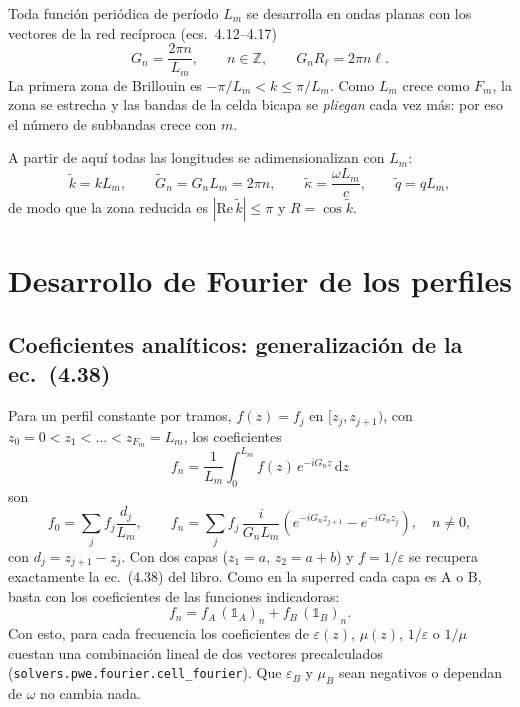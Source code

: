 \documentclass[11pt,a4paper]{article}
\newcommand{\dd}{\mathrm{d}}
\newcommand{\kt}{\tilde k}
\newcommand{\code}[1]{\texttt{#1}}
\begin{document}
Toda función periódica de período $L_m$ se desarrolla en ondas planas con los
vectores de la red recíproca (ecs.~4.12--4.17)
\begin{equation}
G_n=\frac{2\pi n}{L_m},\qquad n\in\mathbb Z,
\qquad G_n R_\ell=2\pi n\ell .
\end{equation}
La primera zona de Brillouin es $-\pi/L_m<k\le\pi/L_m$. Como $L_m$ crece como
$F_m$, la zona se estrecha y las bandas de la celda bicapa se \emph{pliegan}
cada vez más: por eso el número de subbandas crece con $m$.

A partir de aquí todas las longitudes se adimensionalizan con $L_m$:
\begin{equation}
\kt=kL_m,\qquad \tilde G_n=G_nL_m=2\pi n,\qquad \tilde\kappa=\frac{\omega L_m}{c},
\qquad \tilde q=qL_m,
\label{eq:adim}
\end{equation}
de modo que la zona reducida es $|\mathrm{Re}\,\kt|\le\pi$ y $R=\cos\kt$.

\section{Desarrollo de Fourier de los perfiles}\label{sec:fourier}

\subsection{Coeficientes analíticos: generalización de la ec.~(4.38)}

Para un perfil constante por tramos, $f(z)=f_j$ en $[z_j,z_{j+1})$, con
$z_0=0<z_1<\dots<z_{F_m}=L_m$, los coeficientes
\begin{equation}
f_n=\frac1{L_m}\int_0^{L_m} f(z)\,e^{-iG_nz}\,\dd z
\end{equation}
son
\begin{equation}
f_0=\sum_j f_j\frac{d_j}{L_m},\qquad
f_n=\sum_{j} f_j\,\frac{i}{G_nL_m}\left(e^{-iG_nz_{j+1}}-e^{-iG_nz_j}\right),\quad n\neq0,
\label{eq:fourier}
\end{equation}
con $d_j=z_{j+1}-z_j$. Con dos capas ($z_1=a$, $z_2=a+b$) y $f=1/\varepsilon$ se
recupera exactamente la ec.~(4.38) del libro. Como en la superred cada capa es A
o B, basta con los coeficientes de las funciones indicadoras:
\begin{equation}
f_n=f_A\,(\mathbb 1_A)_n+f_B\,(\mathbb 1_B)_n .
\end{equation}
Con esto, para cada frecuencia los coeficientes de $\varepsilon(z)$, $\mu(z)$,
$1/\varepsilon$ o $1/\mu$ cuestan una combinación lineal de dos vectores
precalculados (\code{solvers.pwe.fourier.cell\_fourier}). Que $\varepsilon_B$ y
$\mu_B$ sean negativos o dependan de $\omega$ no cambia nada.
\end{document}
